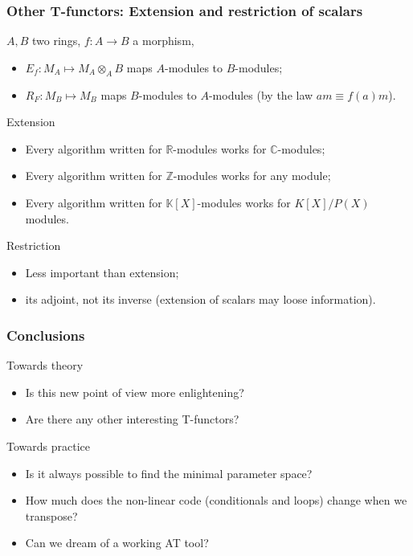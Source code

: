\documentclass[10pt,handout]{beamer}
\newcommand{\Z}{\mathbb{Z}}
\newcommand{\Complex}{\mathbb{C}}
\newcommand{\R}{\mathbb{R}}
\newcommand{\K}{\mathbb{K}}
\newcommand{\ra}{\rightarrow}
\begin{document}
\begin{frame}
  \frametitle{Other T-functors: Extension and restriction of scalars}

  \begin{block}{}
    $A,B$ two rings, $f:A\ra B$ a morphism,
    \begin{itemize}
    \item $E_f : M_A\mapsto M_A\otimes_AB$ maps $A$-modules to
      $B$-modules;
    \item $R_F : M_B\mapsto M_B$ maps $B$-modules to $A$-modules (by
      the law $am \equiv f(a)m$).
    \end{itemize}
  \end{block}

  \begin{block}{Extension}
    \begin{itemize}
    \item Every algorithm written for $\R$-modules works for
      $\Complex$-modules;
    \item Every algorithm written for $\Z$-modules works for any module;
    \item Every algorithm written for $\K[X]$-modules works for
      $K[X]/P(X)$ modules.
    \end{itemize}
  \end{block}

  \begin{block}{Restriction}
    \begin{itemize}
    \item Less important than extension;
    \item its \alert{adjoint}, not its inverse (extension of scalars
      may loose information).
    \end{itemize}
  \end{block}
\end{frame}

\begin{frame}
  \frametitle{Conclusions}

  \begin{block}{Towards theory}
    \begin{itemize}
    \item Is this new point of view more enlightening?
    \item Are there any other interesting T-functors?
    \end{itemize}
  \end{block}

  \begin{block}{Towards practice}
    \begin{itemize}
    \item Is it always possible to find the minimal parameter space?
    \item How much does the non-linear code (conditionals and loops)
      change when we transpose?
    \item Can we dream of a working AT tool?
    \end{itemize}
  \end{block}
\end{frame}
\end{document}
